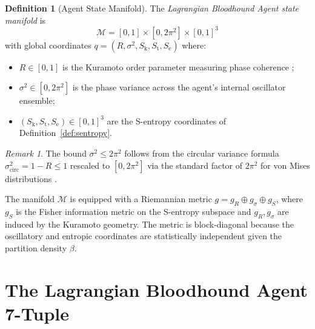 \documentclass[twocolumn,11pt,a4paper]{article}
\theoremstyle{plain}
\theoremstyle{definition}
\newtheorem{definition}[theorem]{Definition}
\theoremstyle{remark}
\newtheorem{remark}[theorem]{Remark}
\newcommand{\Sk}{S_{\mathrm{k}}}
\newcommand{\St}{S_{\mathrm{t}}}
\newcommand{\Se}{S_{\mathrm{e}}}
\newcommand{\Mspace}{\mathcal{M}}
\begin{document}
\begin{definition}[Agent State Manifold]
\label{def:manifold}
The \emph{Lagrangian Bloodhound Agent state manifold} is
\begin{equation}
  \Mspace = [0,1] \times [0,2\pi^2] \times [0,1]^3
\end{equation}
with global coordinates $q = (R, \sigma^2, \Sk, \St, \Se)$ where:
\begin{itemize}[noitemsep]
  \item $R \in [0,1]$ is the Kuramoto order parameter measuring phase coherence \citep{kuramoto1984,acebron2005};
  \item $\sigma^2 \in [0,2\pi^2]$ is the phase variance across the agent's internal oscillator ensemble;
  \item $(\Sk,\St,\Se) \in [0,1]^3$ are the S-entropy coordinates of Definition~\ref{def:sentropy}.
\end{itemize}
\end{definition}

\begin{remark}
The bound $\sigma^2 \le 2\pi^2$ follows from the circular variance formula $\sigma^2_{\mathrm{circ}} = 1 - R \le 1$ rescaled to $[0,2\pi^2]$ via the standard factor of $2\pi^2$ for von Mises distributions \citep{kuramoto1984}.
\end{remark}

The manifold $\Mspace$ is equipped with a Riemannian metric $g = g_R \oplus g_{\sigma} \oplus g_{S}$, where $g_S$ is the Fisher information metric on the S-entropy subspace and $g_R, g_\sigma$ are induced by the Kuramoto geometry.  The metric is block-diagonal because the oscillatory and entropic coordinates are statistically independent given the partition density $\beta$.

\section{The Lagrangian Bloodhound Agent 7-Tuple}
\label{sec:7tuple}
\end{document}

